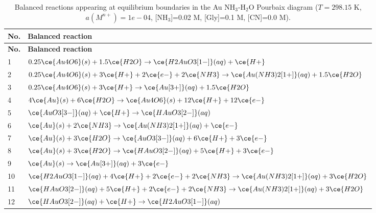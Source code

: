 \begin{longtable}{|p{0.9cm}|p{13.3cm}|}
\caption{Balanced reactions appearing at equilibrium boundaries in the Au NH$_3$-H$_2$O Pourbaix diagram ($T=298.15$ K, $a(M^{n+})=1e-04$, [NH$_3$]=0.02 M, [Gly]=0.1 M, [CN]=0.0 M).}\\
\hline
\textbf{No.} & \textbf{Balanced reaction} \\ \hline
\endfirsthead
\hline
\textbf{No.} & \textbf{Balanced reaction} \\ \hline
\endhead
1 & $0.25 \ce{Au4O6}(s) + 1.5 \ce{H2O} \rightarrow \ce{H2AuO3[1-]}(aq) + \ce{H+}$ \\ \hline
2 & $0.25 \ce{Au4O6}(s) + 3 \ce{H+} + 2 \ce{e-} + 2 \ce{NH3} \rightarrow \ce{Au(NH3)2[1+]}(aq) + 1.5 \ce{H2O}$ \\ \hline
3 & $0.25 \ce{Au4O6}(s) + 3 \ce{H+} \rightarrow \ce{Au[3+]}(aq) + 1.5 \ce{H2O}$ \\ \hline
4 & $4 \ce{Au}(s) + 6 \ce{H2O} \rightarrow \ce{Au4O6}(s) + 12 \ce{H+} + 12 \ce{e-}$ \\ \hline
5 & $\ce{AuO3[3-]}(aq) + \ce{H+} \rightarrow \ce{HAuO3[2-]}(aq)$ \\ \hline
6 & $\ce{Au}(s) + 2 \ce{NH3} \rightarrow \ce{Au(NH3)2[1+]}(aq) + \ce{e-}$ \\ \hline
7 & $\ce{Au}(s) + 3 \ce{H2O} \rightarrow \ce{AuO3[3-]}(aq) + 6 \ce{H+} + 3 \ce{e-}$ \\ \hline
8 & $\ce{Au}(s) + 3 \ce{H2O} \rightarrow \ce{HAuO3[2-]}(aq) + 5 \ce{H+} + 3 \ce{e-}$ \\ \hline
9 & $\ce{Au}(s) \rightarrow \ce{Au[3+]}(aq) + 3 \ce{e-}$ \\ \hline
10 & $\ce{H2AuO3[1-]}(aq) + 4 \ce{H+} + 2 \ce{e-} + 2 \ce{NH3} \rightarrow \ce{Au(NH3)2[1+]}(aq) + 3 \ce{H2O}$ \\ \hline
11 & $\ce{HAuO3[2-]}(aq) + 5 \ce{H+} + 2 \ce{e-} + 2 \ce{NH3} \rightarrow \ce{Au(NH3)2[1+]}(aq) + 3 \ce{H2O}$ \\ \hline
12 & $\ce{HAuO3[2-]}(aq) + \ce{H+} \rightarrow \ce{H2AuO3[1-]}(aq)$ \\ \hline
\end{longtable}
